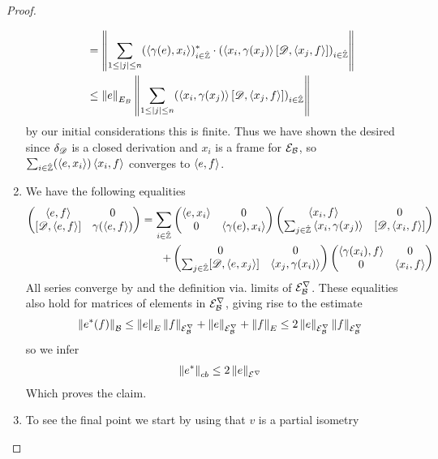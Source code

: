 \begin{theorem}
\begin{proof}
\begin{enumerate}
\begin{align*}
			&=\left \Vert \sum_{1\leq |j|\leq n}(\left \langle \gamma(e),x_i \right \rangle)^*_{i\in \hat{\mathbb{Z}}} \cdot \left ( \left \langle x_i,\gamma(x_j) \right \rangle[\mathscr{D},\left \langle x_j,f \right \rangle] \right )_{i\in \hat{\mathbb{Z}}} \right \Vert \\
			&\leq \left \Vert e \right \Vert_{E_B} \left \Vert \sum_{1\leq |j|\leq n} (\left \langle x_i,\gamma(x_j) \right \rangle[\mathscr{D},\left \langle x_j,f \right \rangle])_{i\in \hat{\mathbb{Z}}} \right \Vert
		\end{align*}
		by our initial considerations this is finite. Thus we have shown the desired since $\delta_{\mathscr{D}}$ is a closed derivation and $x_i$ is a frame for $\mathcal{E}_{\mathcal{B}}$, so $\sum_{i\in \hat{\mathbb{Z}}}(\left \langle e,x_i \right \rangle)\left \langle x_i,f \right \rangle$ converges to $\left \langle e,f \right \rangle$.
	\item
		We have the following equalities
		\begin{align*}
			\begin{pmatrix} \ip{e}{f} & 0 \\ [\D,\ip{e}{f}] & \gamma(\ip{e}{f}) \end{pmatrix}=\sum_{i\in \Zred}\begin{pmatrix} \ip{e}{x_i} & 0 \\ 0 & \ip{\gamma(e)}{x_i} \end{pmatrix}\begin{pmatrix} \ip{x_i}{f} & 0 \\ \sum_{j\in \Zred} \ip{x_i}{\gamma(x_j)} & [\D,\ip{x_i}{f}]\end{pmatrix} \\
			+\begin{pmatrix} 0 & 0 \\ \sum_{j\in \Zred} [\D,\ip{e}{x_j}] & \ip{x_j}{\gamma(x_i)}\end{pmatrix}\begin{pmatrix} \ip{\gamma(x_i)}{f} & 0 \\ 0 & \ip{x_i}{f}\end{pmatrix}
		\end{align*}
		All series converge by  and the definition via. limits of $\mathcal{E}^\nabla_{\mathcal{B}}$.
		These equalities also hold for matrices of elements in $\mathcal{E}^\nabla_{\mathcal{B}}$, giving rise to the estimate 
		\begin{align*}
			\left \Vert e^*(f) \right \Vert_{\mathcal{B}}\leq \left \Vert e \right \Vert_E\left \Vert f \right \Vert_{\mathcal{E}^\nabla_{\mathcal{B}}}+\left \Vert e \right \Vert_{\mathcal{E}^\nabla_{\mathcal{B}}}+\left \Vert f \right \Vert_E\leq 2\left \Vert e \right \Vert_{\mathcal{E}^\nabla_{\mathcal{B}}}\left \Vert f \right \Vert_{\mathcal{E}^\nabla_{\mathcal{B}}}
		\end{align*}
		so we infer 
		\begin{align*}
			\left \Vert e^* \right \Vert_{cb}\leq 2 \left \Vert e \right \Vert_{\mathcal{E}^\nabla}
		\end{align*}
		Which proves the claim.
	\item
		To see the final point we start by using that $v$ is a partial isometry

\end{enumerate}
\end{proof}
\end{theorem}
